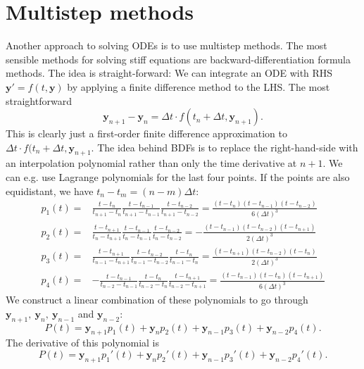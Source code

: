 \documentclass[10pt,a4paper]{article}
\newcommand{\bvec}[1]{\mathbf{#1}}
\begin{document}
\section{Multistep methods}
Another approach to solving ODEs is to use multistep methods.
The most sensible methods for solving stiff equations are backward-differentiation formula methods.
The idea is straight-forward: We can integrate an ODE with RHS $\bvec{y}' = f(t, \bvec{y})$ by applying a finite difference method to the LHS. The most straightforward
\begin{equation*}
  \bvec{y}_{n+1} - \bvec{y}_n = \Delta t\cdot f(t_n + \Delta t, \bvec{y}_{n+1}).
\end{equation*}
This is clearly just a first-order finite difference approximation to $\Delta t \cdot f(t_n + \Delta t, \bvec{y}_{n+1}.$
The idea behind BDFs is to replace the right-hand-side with an interpolation polynomial rather than only the time derivative at $n+1$.
We can e.g. use Lagrange polynomials for the last four points. If the points are also equidistant, we have $t_n - t_m=(n-m)\Delta t:$
\begin{align*}
  p_1(t) =& \frac{t - t_n}{t_{n+1}-t_{n}} \frac{t - t_{n-1}}{t_{n+1} - t_{n-1}} \frac{t - t_{n-2}}{t_{n+1} - t_{n-2}} = \frac{(t-t_n)(t-t_{n-1})(t-t_{n-2})}{6(\Delta t)^3} \\
  p_2(t) =& \frac{t - t_{n+1}}{t_{n}-t_{n+1}} \frac{t - t_{n-1}}{t_{n} - t_{n-1}} \frac{t - t_{n-2}}{t_{n} - t_{n-2}} = -\frac{(t - t_{n-1})(t-t_{n-2})(t-t_{n+1})}{2(\Delta t)^3} \\
  p_3(t) =& \frac{t - t_{n+1}}{t_{n-1}-t_{n+1}} \frac{t - t_{n-2}}{t_{n-1} - t_{n-2}} \frac{t - t_{n}}{t_{n-1} - t_{n}} = \frac{(t - t_{n+1})(t-t_{n-2})(t-t_{n})}{2 (\Delta t)^3} \\
  p_4(t) =& -\frac{t - t_{n-1}}{t_{n-2}-t_{n-1}} \frac{t - t_{n}}{t_{n-2} - t_{n}} \frac{t - t_{n+1}}{t_{n-2} - t_{n+1}} = \frac{(t - t_{n-1})(t - t_{n})(t-t_{n+1})}{6 (\Delta t)^3}
\end{align*}
We construct a linear combination of these polynomials to go through $\bvec{y}_{n+1},~\bvec{y}_n,~\bvec{y}_{n-1}$ and $\bvec{y}_{n-2}:$
\begin{equation*}
  P(t) = \bvec{y}_{n+1}p_1(t) + \bvec{y}_{n}p_2(t) + \bvec{y}_{n-1}p_3(t) + \bvec{y}_{n-2}p_4(t).
\end{equation*}
The derivative of this polynomial is
\begin{equation*}
P(t) = \bvec{y}_{n+1}p_1'(t) + \bvec{y}_{n}p_2'(t) + \bvec{y}_{n-1}p_3'(t) + \bvec{y}_{n-2}p_4'(t).
\end{equation*}
\end{document}
